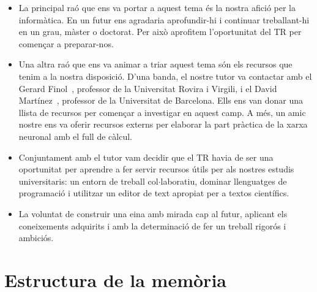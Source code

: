 \begin{itemize}
\item La principal raó que ens va portar a aquest tema és la nostra afició per la informàtica. En un futur ens agradaria aprofundir-hi i continuar treballant-hi en un grau, màster o doctorat. Per això aprofitem l’oportunitat del TR per començar a preparar-nos.

\clearpage

\item Una altra raó que ens va animar a triar aquest tema són els recursos que tenim a la nostra disposició. D'una banda, el nostre tutor va contactar amb el Gerard Finol~\cite{gerard}, professor de la Universitat Rovira i Virgili, i el David Martínez~\cite{david}, professor de la Universitat de Barcelona. Ells ens van donar una llista de recursos per començar a investigar en aquest camp. A més, un amic nostre ens va oferir recursos externs per elaborar la part pràctica de la xarxa neuronal amb el full de càlcul.

\item Conjuntament amb el tutor vam decidir que el TR havia de ser una oportunitat per aprendre a fer servir recursos útils per als nostres estudis universitaris: un entorn de treball col$\cdot$laboratiu, dominar llenguatges de programació i utilitzar un editor de text apropiat per a textos científics.

\item La voluntat de construir una eina amb mirada cap al futur, aplicant els coneixements adquirits i amb la determinació de fer un treball rigorós i ambiciós.
\end{itemize}

\section{Estructura de la memòria}

